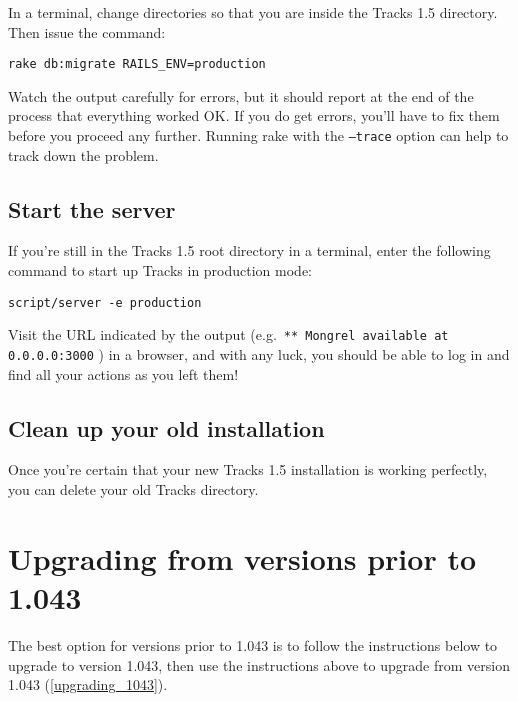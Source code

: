 \documentclass[10pt,twoside]{memoir}
\begin{document}
In a terminal, change directories so that you are inside the Tracks 1.5 directory. Then issue the command:


\texttt{rake db:migrate RAILS\_ENV=production}


Watch the output carefully for errors, but it should report at the end of the process that everything worked OK. If you do get errors, you'll have to fix them before you proceed any further. Running rake with the \texttt{--trace} option can help to track down the problem.


\subsection{Start the server}
\label{startserver_upgrade}

If you're still in the Tracks 1.5 root directory in a terminal, enter the following command to start up Tracks in production mode:


\texttt{script/server -e production}


Visit the URL indicated by the output (e.g.\ \texttt{** Mongrel available at 0.0.0.0:3000}
) in a browser, and with any luck, you should be able to log in and find all your actions as you left them!


\subsection{Clean up your old installation}
\label{cleanup_upgrade}

Once you're certain that your new Tracks 1.5 installation is working perfectly, you can delete your old Tracks directory.


\section{Upgrading from versions prior to 1.043}
\label{upgradingfromversionspriorto1.043}

The best option for versions prior to 1.043 is to follow the instructions below to upgrade to version 1.043, then use the instructions above to upgrade from version 1.043 (\autoref{upgrading_1043}).
\end{document}
